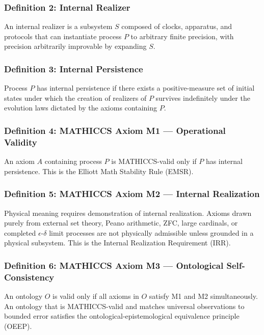 \documentclass[11pt,a4paper]{article}
\begin{document}
\subsubsection{Definition 2: Internal Realizer}

An internal realizer is a subsystem $S$ composed of clocks, apparatus, and protocols that can instantiate process $P$ to arbitrary finite precision, with precision arbitrarily improvable by expanding $S$.

\subsubsection{Definition 3: Internal Persistence}

Process $P$ has internal persistence if there exists a positive-measure set of initial states under which the creation of realizers of $P$ survives indefinitely under the evolution laws dictated by the axioms containing $P$.

\subsubsection{Definition 4: MATHICCS Axiom M1 --- Operational Validity}

An axiom $A$ containing process $P$ is MATHICCS-valid only if $P$ has internal persistence. This is the Elliott Math Stability Rule (EMSR).

\subsubsection{Definition 5: MATHICCS Axiom M2 --- Internal Realization}

Physical meaning requires demonstration of internal realization. Axioms drawn purely from external set theory, Peano arithmetic, ZFC, large cardinals, or completed $\epsilon$-$\delta$ limit processes are not physically admissible unless grounded in a physical subsystem. This is the Internal Realization Requirement (IRR).

\subsubsection{Definition 6: MATHICCS Axiom M3 --- Ontological Self-Consistency}

An ontology $O$ is valid only if all axioms in $O$ satisfy M1 and M2 simultaneously. An ontology that is MATHICCS-valid and matches universal observations to bounded error satisfies the ontological-epistemological equivalence principle (OEEP).
\end{document}
